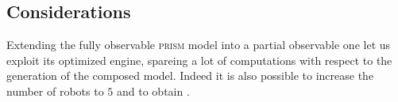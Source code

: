 \documentclass{article}
\newcommand{\PRISM}{\textsc{prism}}
\begin{document}

\subsection*{Considerations} %
\label{sub:considerations}

Extending the fully observable \PRISM{} model into a partial observable one let us exploit its optimized engine, spareing a lot of computations with respect to the generation of the composed model. Indeed it is also possible to increase the number of robots to $5$ and to obtain .




\end{document}
